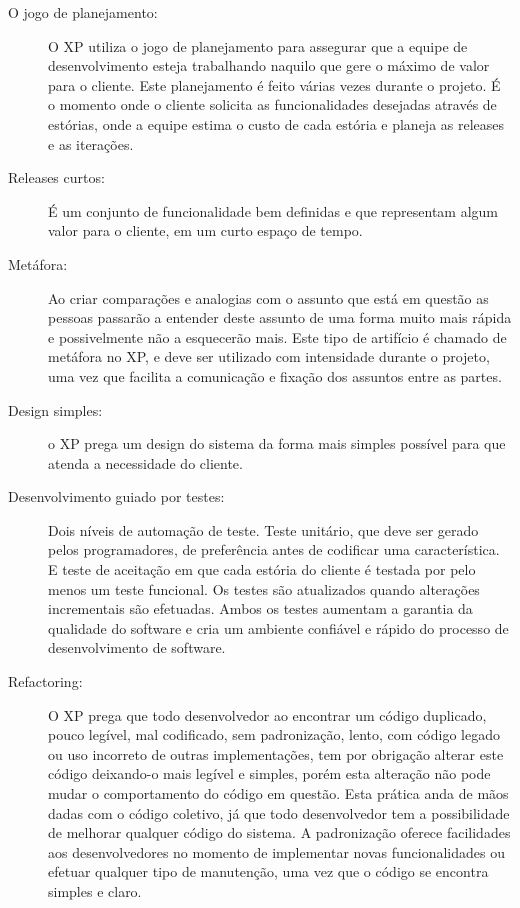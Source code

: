 \begin{description}
  \item [O jogo de planejamento:] O XP utiliza o jogo de planejamento para assegurar que a equipe de desenvolvimento esteja trabalhando naquilo que gere o máximo de valor para o cliente. Este planejamento é feito várias vezes durante o projeto. É o momento onde o cliente solicita as funcionalidades desejadas através de estórias, onde a equipe estima o custo de cada estória e planeja as releases e as iterações.

  \item [Releases curtos:] É um conjunto de funcionalidade bem definidas e que representam algum valor para o cliente, em um curto espaço de tempo.

  \item [Metáfora:] Ao criar comparações e analogias com o assunto que está em questão as pessoas passarão a entender deste assunto de uma forma muito mais rápida e possivelmente não a esquecerão mais. Este tipo de artifício é chamado de metáfora no XP, e deve ser utilizado com intensidade durante o projeto, uma vez que facilita a comunicação e fixação dos assuntos entre as partes.

  \item [Design simples:] o XP prega um design do sistema da forma mais simples possível para que atenda a necessidade do cliente.

  \item [Desenvolvimento guiado por testes:] Dois níveis de automação de teste. Teste unitário, que deve ser gerado pelos programadores, de preferência antes de codificar uma característica. E teste de aceitação em que cada estória do cliente é testada por pelo menos um teste funcional. Os testes são atualizados quando alterações incrementais são efetuadas. Ambos os testes aumentam a garantia da qualidade do software e cria um ambiente confiável e rápido do processo de desenvolvimento de software.

  \item [Refactoring:] O XP prega que todo desenvolvedor ao encontrar um código duplicado, pouco legível, mal codificado, sem padronização, lento, com código legado ou uso incorreto de outras implementações, tem por obrigação alterar este código deixando-o mais legível e simples, porém esta alteração não pode mudar o comportamento do código em questão. Esta prática anda de mãos dadas com o código coletivo, já que todo desenvolvedor tem a possibilidade de melhorar qualquer código do sistema. A padronização oferece facilidades aos desenvolvedores no momento de implementar novas funcionalidades ou efetuar qualquer tipo de manutenção, uma vez que o código se encontra simples e claro.


\end{description}
